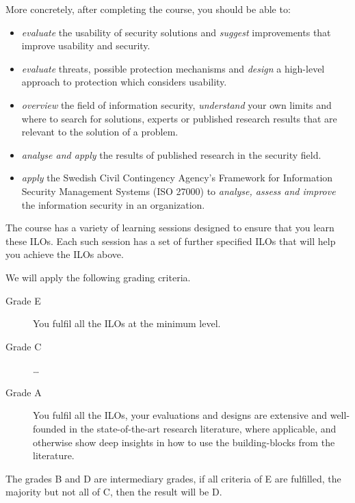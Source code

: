 More concretely, after completing the course, you should be able to:
\begin{itemize}
  \item \emph{evaluate} the usability of security solutions and \emph{suggest} 
    improvements that improve usability and security.
  \item \emph{evaluate} threats, possible protection mechanisms and 
    \emph{design} a high-level approach to protection which considers 
    usability.
  \item \emph{overview} the field of information security, \emph{understand} 
    your own limits and where to search for solutions, \eg experts or published 
    research results that are relevant to the solution of a problem.
  \item \emph{analyse and apply} the results of published research in the 
    security field.
  \item \emph{apply} the Swedish Civil Contingency Agency's Framework for 
    Information Security Management Systems (ISO 27000) to \emph{analyse, assess 
      and improve} the information security in an organization.
\end{itemize}
The course has a variety of learning sessions designed to ensure that you learn 
these \acp{ILO}.
Each such session has a set of further specified \acp{ILO} that will help you 
achieve the \acp{ILO} above.

We will apply the following grading criteria.
\begin{description}
  \item[Grade E] You fulfil all the \acp{ILO} at the minimum level.
  \item[Grade C] \dots
  \item[Grade A] You fulfil all the \acp{ILO},
    your evaluations and designs are extensive and well-founded in the 
    state-of-the-art research literature, where applicable, and otherwise show 
    deep insights in how to use the building-blocks from the literature.
\end{description}
The grades B and D are intermediary grades, \eg if all criteria of E are 
fulfilled, the majority but not all of C, then the result will be D.

